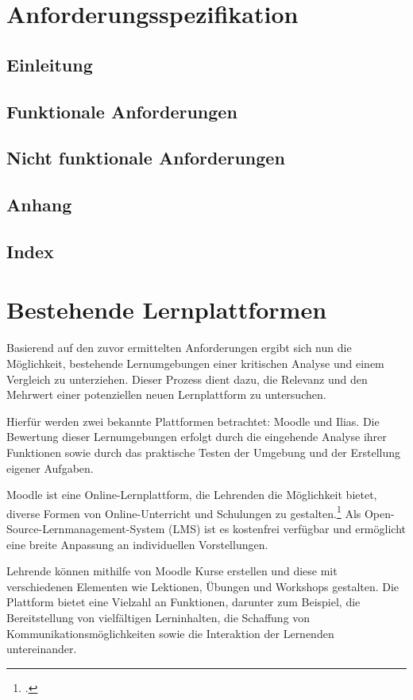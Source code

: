 \section{Anforderungsspezifikation}
\subsection{Einleitung}
\subsection{Funktionale Anforderungen}
\subsection{Nicht funktionale Anforderungen}
\subsection{Anhang}
\subsection{Index}

\section{Bestehende Lernplattformen}
Basierend auf den zuvor ermittelten Anforderungen ergibt sich nun die Möglichkeit, bestehende Lernumgebungen einer kritischen Analyse und einem Vergleich zu unterziehen. Dieser Prozess dient dazu, die Relevanz und den Mehrwert einer potenziellen neuen Lernplattform zu untersuchen.

Hierfür werden zwei bekannte Plattformen betrachtet: Moodle und Ilias.
Die Bewertung dieser Lernumgebungen erfolgt durch die eingehende Analyse ihrer Funktionen sowie durch das praktische Testen der Umgebung und der Erstellung eigener Aufgaben.

Moodle ist eine Online-Lernplattform, die Lehrenden die Möglichkeit bietet, diverse Formen von Online-Unterricht und Schulungen zu gestalten.\footcite{moodle}
Als Open-Source-Lernmanagement-System (LMS) ist es kostenfrei verfügbar und ermöglicht eine breite Anpassung an individuellen Vorstellungen.

Lehrende können mithilfe von Moodle Kurse erstellen und diese mit verschiedenen Elementen wie Lektionen, Übungen und Workshops gestalten. Die Plattform bietet eine Vielzahl an Funktionen, darunter zum Beispiel, die Bereitstellung von vielfältigen Lerninhalten, die Schaffung von Kommunikationsmöglichkeiten sowie die Interaktion der Lernenden untereinander.

